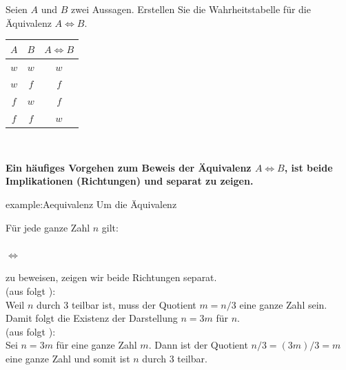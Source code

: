 \begin{myexercise}%
	\noindent
	Seien $A$ und $B$ zwei Aussagen. Erstellen Sie die Wahrheitstabelle für die Äquivalenz $A \Leftrightarrow B$.\\
\end{myexercise}
\begin{myanswer}
	\noindent
	\begin{table}[H]
		\begin{center}
			\begin{tabular}{c|c|c}
				$A$ & $B$ & $A\Leftrightarrow B$ \\ \hline
				$w$ & $w$ & $w$                  \\
				$w$ & $f$ & $f$                  \\
				$f$ & $w$ & $f$                  \\
				$f$ & $f$ & $w$
			\end{tabular}
		\end{center}
	\end{table}
	\noindent
	\\
\end{myanswer}

\clearpage
\noindent
\textbf{Ein häufiges Vorgehen zum Beweis der Äquivalenz $A \Leftrightarrow B$, ist beide Implikationen (Richtungen) \quotes{$\Rightarrow$} und \quotes{$\Leftarrow$} separat zu zeigen.}
\begin{example}{example:Aequivalenz}
	Um die Äquivalenz
	\begin{center}
		Für jede ganze Zahl $n$ gilt:\\
		\\
		$\Leftrightarrow$ \\
	\end{center}
	zu beweisen, zeigen wir beide Richtungen separat.\\

	\noindent
	\quotes{$\Rightarrow$} (aus  folgt ):\\
	Weil $n$ durch 3 teilbar ist, muss der Quotient $m = n/3$ eine ganze Zahl sein. Damit folgt die Existenz der Darstellung $n = 3m$ für $n$.\\

	\noindent
	\quotes{$\Leftarrow$} (aus  folgt ):\\
	Sei $n = 3m$ für eine ganze Zahl $m$. Dann ist der Quotient $n / 3 = (3m)/3 = m$ eine ganze Zahl und somit ist $n$ durch 3 teilbar.
\end{example}
\clearpage

